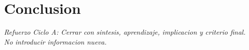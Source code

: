 \documentclass[
	spanish,
	letterpaper, oneside
]{article}
\begin{document}

\section{Conclusion}


\textit{Refuerzo Ciclo A: Cerrar con sintesis, aprendizaje, implicacion y criterio final. No introducir informacion nueva.}

\clearpage
\nocite{itescaSitioWeb}

\end{document}
